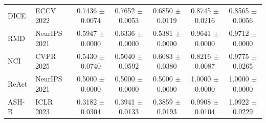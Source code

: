 \begin{table}[!htbp]
{\begin{tabular}{llccccc}
DICE & ECCV 2022 & 0.7436 $\pm$ 0.0074 & 0.7652 $\pm$ 0.0053 & 0.6850 $\pm$ 0.0119 & 0.8745 $\pm$ 0.0216 & 0.8565 $\pm$ 0.0056 \\
RMD & NeurIPS 2021 & 0.5947 $\pm$ 0.0000 & 0.6336 $\pm$ 0.0000 & 0.5381 $\pm$ 0.0000 & 0.9641 $\pm$ 0.0000 & 0.9712 $\pm$ 0.0000 \\
NCI & CVPR 2025 & 0.5430 $\pm$ 0.0740 & 0.5040 $\pm$ 0.0592 & 0.6083 $\pm$ 0.0380 & 0.8216 $\pm$ 0.0087 & 0.9775 $\pm$ 0.0265 \\
ReAct & NeurIPS 2021 & 0.5000 $\pm$ 0.0000 & 0.5000 $\pm$ 0.0000 & 0.5000 $\pm$ 0.0000 & 1.0000 $\pm$ 0.0000 & 1.0000 $\pm$ 0.0000 \\
ASH-B & ICLR 2023 & 0.3182 $\pm$ 0.0304 & 0.3941 $\pm$ 0.0133 & 0.3859 $\pm$ 0.0193 & 0.9908 $\pm$ 0.0104 & 1.0922 $\pm$ 0.0229 \\
\bottomrule
\end{tabular}%
}
\end{table}

\clearpage

